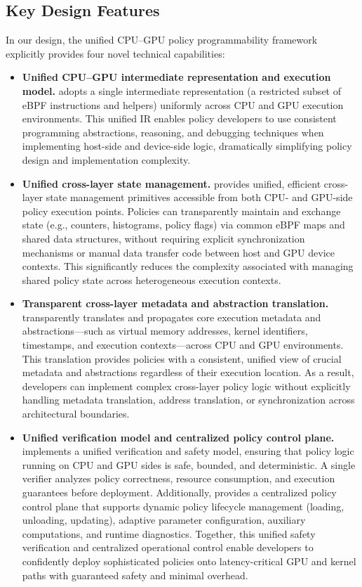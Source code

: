 \subsection{Key Design Features}

In our design, the unified CPU--GPU policy programmability framework explicitly provides four novel technical capabilities:

\begin{itemize}[leftmargin=*,itemsep=0pt]
    \item \textbf{Unified CPU--GPU intermediate representation and execution model.}
    \sys adopts a single intermediate representation (a restricted subset of eBPF instructions and helpers) uniformly across CPU and GPU execution environments. This unified IR enables policy developers to use consistent programming abstractions, reasoning, and debugging techniques when implementing host-side and device-side logic, dramatically simplifying policy design and implementation complexity.

    \item \textbf{Unified cross-layer state management.}
    \sys provides unified, efficient cross-layer state management primitives accessible from both CPU- and GPU-side policy execution points. Policies can transparently maintain and exchange state (e.g., counters, histograms, policy flags) via common eBPF maps and shared data structures, without requiring explicit synchronization mechanisms or manual data transfer code between host and GPU device contexts. This significantly reduces the complexity associated with managing shared policy state across heterogeneous execution contexts.

    \item \textbf{Transparent cross-layer metadata and abstraction translation.}
    \sys transparently translates and propagates core execution metadata and abstractions---such as virtual memory addresses, kernel identifiers, timestamps, and execution contexts---across CPU and GPU environments. This translation provides policies with a consistent, unified view of crucial metadata and abstractions regardless of their execution location. As a result, developers can implement complex cross-layer policy logic without explicitly handling metadata translation, address translation, or synchronization across architectural boundaries.

    \item \textbf{Unified verification model and centralized policy control plane.}
    \sys implements a unified verification and safety model, ensuring that policy logic running on CPU and GPU sides is safe, bounded, and deterministic. A single verifier analyzes policy correctness, resource consumption, and execution guarantees before deployment. Additionally, \sys provides a centralized policy control plane that supports dynamic policy lifecycle management (loading, unloading, updating), adaptive parameter configuration, auxiliary computations, and runtime diagnostics. Together, this unified safety verification and centralized operational control enable developers to confidently deploy sophisticated policies onto latency-critical GPU and kernel paths with guaranteed safety and minimal overhead.
\end{itemize}

